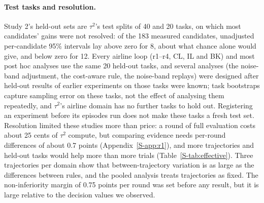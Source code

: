 \documentclass[11pt]{article}
\begin{document}
\paragraph{Test tasks and resolution.} Study 2's held-out sets are $\tau^2$'s test splits of 40 and 20 tasks, on which most candidates' gains were not resolved: of the 183 measured candidates, unadjusted per-candidate 95\% intervals lay above zero for 8, about what chance alone would give, and below zero for 12. Every airline loop (r1--r4, CL, IL and BK) and most post hoc analyses use the same 20 held-out tasks, and several analyses (the noise-band adjustment, the cost-aware rule, the noise-band replays) were designed after held-out results of earlier experiments on those tasks were known; task bootstraps capture sampling error on these tasks, not the effect of analysing them repeatedly, and $\tau^2$'s airline domain has no further tasks to hold out. Registering an experiment before its episodes run does not make these tasks a fresh test set. Resolution limited these studies more than price: a round of full evaluation costs about 25 cents of $\tau^2$ compute, but comparing evidence needs per-round differences of about 0.7 points (Appendix~\ref*{S-app:r1}), and more trajectories and held-out tasks would help more than more trials (Table~\ref*{S-tab:effective}). Three trajectories per domain show that between-trajectory variation is as large as the differences between rules, and the pooled analysis treats trajectories as fixed. The non-inferiority margin of 0.75 points per round was set before any result, but it is large relative to the decision values we observed.
\end{document}
